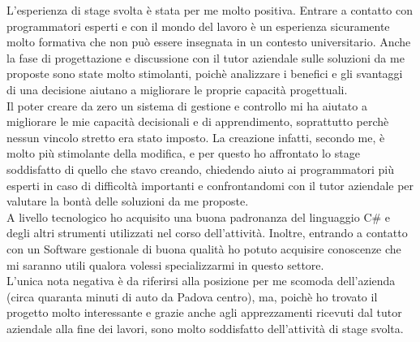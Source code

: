 L'esperienza di stage svolta è stata per me molto positiva. Entrare a contatto con programmatori esperti e con il mondo del lavoro è un esperienza sicuramente molto formativa che non può essere insegnata in un contesto universitario. Anche la fase di progettazione e discussione con il tutor aziendale sulle soluzioni da me proposte sono state molto stimolanti, poichè analizzare i benefici e gli svantaggi di una decisione aiutano a migliorare le proprie capacità progettuali.
\\Il poter creare da zero un sistema di gestione e controllo mi ha aiutato a migliorare le mie capacità decisionali e di apprendimento, soprattutto perchè nessun vincolo stretto era stato imposto. La creazione infatti, secondo me, è molto più stimolante della modifica, e per questo ho affrontato lo stage soddisfatto di quello che stavo creando, chiedendo aiuto ai programmatori più esperti in caso di difficoltà importanti e confrontandomi con il tutor aziendale per valutare la bontà delle soluzioni da me proposte.
\\A livello tecnologico ho acquisito una buona padronanza del linguaggio C\# e degli altri strumenti utilizzati nel corso dell'attività. Inoltre, entrando a contatto con un Software gestionale di buona qualità ho potuto acquisire conoscenze che mi saranno utili qualora volessi specializzarmi in questo settore.
\\L'unica nota negativa è da riferirsi alla posizione per me scomoda dell'azienda (circa quaranta minuti di auto da Padova centro), ma, poichè ho trovato il progetto molto interessante e grazie anche agli apprezzamenti ricevuti dal tutor aziendale alla fine dei lavori, sono molto soddisfatto dell'attività di stage svolta.